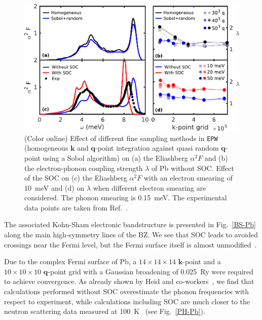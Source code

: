 \documentclass[final,3p,times,twocolumn]{elsarticle}
\begin{document}
\begin{figure}[t!]
  \centering
  \includegraphics[width=0.8\linewidth]{Pb_a2F_conv10.pdf}
  \caption{\label{a2F-Pb} (Color online) 
   Effect of different fine sampling methods in \texttt{EPW} (homogeneous $\mathbf{k}$ and $\mathbf{q}$-point integration against quasi random $\mathbf{q}$-point using a Sobol algorithm) on (a) the Eliashberg $\alpha^2F$ and (b) the electron-phonon coupling strength $\lambda$ of Pb without SOC. Effect of the SOC on (c) the Eliashberg $\alpha^2F$ with an electron smearing of 10~meV and (d) on $\lambda$ when different electron smearing are considered. The phonon smearing is 0.15~meV. The experimental data points are taken from Ref.~\cite{Scalapino1969}. }
\end{figure}

The associated Kohn-Sham electronic bandstructure is presented in Fig.~\ref{BS-Pb} along the main high-symmetry lines of the BZ. We see that SOC leads to avoided crossings near the Fermi level, but the Fermi surface itself is almost unmodified~\cite{Corso2008}. 


Due to the complex Fermi surface of Pb, a $14\times14\times14$ $\mathbf{k}$-point and a $10\times10\times10$ $\mathbf{q}$-point grid with a Gaussian broadening of 0.025~Ry were required to achieve convergence. As already shown by Heid and co-workers~\cite{Heid2010}, we find that calculations performed without SOC overestimate the phonon frequencies with respect to experiment, while calculations including SOC are much closer to the neutron scattering data measured at 100~K~\cite{Brockhouse1962} (see Fig.~\ref{PH-Pb}). 
\end{document}
